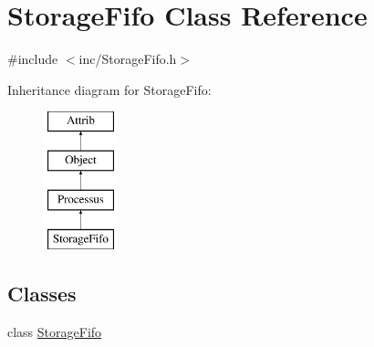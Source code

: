 \hypertarget{classStorageFifo}{}\section{Storage\+Fifo Class Reference}
\label{classStorageFifo}


{\ttfamily \#include $<$inc/\+Storage\+Fifo.\+h$>$}

Inheritance diagram for Storage\+Fifo\+:\begin{figure}[H]
\begin{center}
\leavevmode
\includegraphics[height=4.000000cm]{classStorageFifo}
\end{center}
\end{figure}
\subsection*{Classes}
\begin{DoxyCompactItemize}
\item 
class \hyperlink{classStorageFifo_1_1StorageFifo}{Storage\+Fifo}
\end{DoxyCompactItemize}
